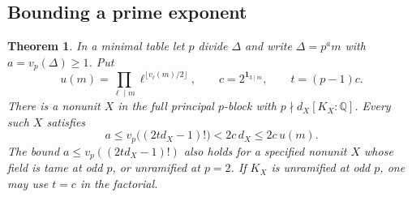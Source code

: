 \documentclass[11pt,a4paper]{article}
\numberwithin{equation}{section}
\newtheorem{theorem}{Theorem}[section]
\theoremstyle{remark}
\newcommand{\QQ}{\mathbb Q}
\begin{document}
\subsection{Bounding a prime exponent}\label{found:D:2}
\begin{theorem}\label{found:D:2.1}\label{found:D:key:th:exponent}
In a minimal table let $p$ divide $\Delta$ and write $\Delta=p^a m$
with $a=v_p(\Delta)\ge1$. Put
\[
 u(m)=\prod_{\ell\mid m}\ell^{\lfloor v_\ell(m)/2\rfloor},
 \qquad c=2^{\mathbf1_{3\mid m}},\qquad t=(p-1)c .
\]
There is a nonunit $X$ in the full principal $p$-block with $p\nmid d_X[K_X:\QQ]$. Every such $X$ satisfies
\[
   a\le v_p\big((2t d_X-1)!\big)<2c\,d_X\le2c\,u(m).
\]
The bound $a\le v_p((2t d_X-1)!)$ also holds for a specified nonunit $X$ whose field is tame at odd $p$, or unramified at $p=2$. If $K_X$ is unramified at odd $p$, one may use $t=c$ in the factorial.
\end{theorem}
\end{document}
